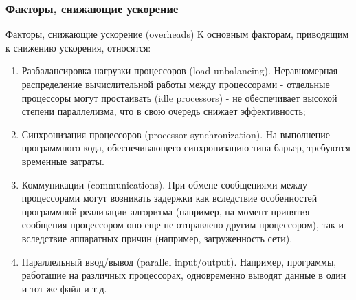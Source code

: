 \subsubsection{Факторы, снижающие ускорение }
Факторы, снижающие ускорение (overheads)
К основным факторам, приводящим к снижению ускорения, относятся: 
\begin{enumerate}
\item Разбалансировка нагрузки процессоров (load unbalancing). Неравномерная распределение вычислительной работы между процессорами - отдельные процессоры могут простаивать (idle processors) - не обеспечивает высокой степени параллелизма, что в свою очередь снижает эффективность; 
\item Синхронизация процессоров (processor synchronization). На выполнение программного кода, обеспечивающего синхронизацию типа барьер, требуются временные затраты. 
\item Коммуникации (communications). При обмене сообщениями между процессорами могут возникать задержки как вследствие особенностей программной реализации алгоритма (например, на момент принятия сообщения процессором оно еще не отправлено другим процессором), так и вследствие аппаратных причин (например, загруженность сети). 
\item Параллельный ввод/вывод (parallel input/output). Например, программы, работащие на различных процессорах, одновременно выводят данные в один и тот же файл и т.д. 
\end{enumerate}
